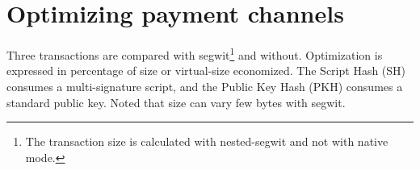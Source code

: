 \section{Optimizing payment channels}


Three transactions are compared with \gls{segwit}\footnote{ The transaction size
is calculated with nested-\gls{segwit} and not with native mode.} and without.
Optimization is expressed in percentage of size or virtual-size economized. The
Script Hash (SH) consumes a multi-signature script, and the Public Key Hash
(PKH) consumes a standard public key. Noted that size can vary few bytes with
\gls{segwit}.

%

